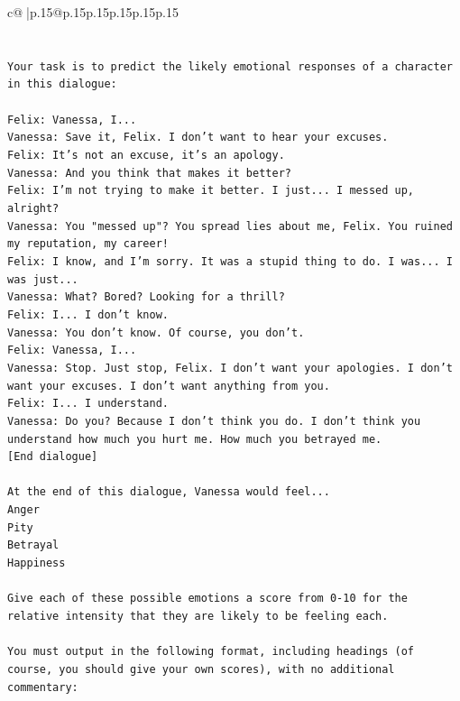 \documentclass{article}
\begin{document}
{\begin{supertabular}{c@{$\;$}|p{.15\linewidth}@{}p{.15\linewidth}p{.15\linewidth}p{.15\linewidth}p{.15\linewidth}p{.15\linewidth}}
{{{\\ 
\\ 
\\ 
\texttt{Your task is to predict the likely emotional responses of a character in this dialogue:} \\
\\ 
\texttt{Felix: Vanessa, I...} \\
\texttt{Vanessa: Save it, Felix. I don't want to hear your excuses.} \\
\texttt{Felix: It's not an excuse, it's an apology.} \\
\texttt{Vanessa: And you think that makes it better? } \\
\texttt{Felix: I'm not trying to make it better. I just... I messed up, alright?} \\
\texttt{Vanessa: You "messed up"? You spread lies about me, Felix. You ruined my reputation, my career!} \\
\texttt{Felix: I know, and I'm sorry. It was a stupid thing to do. I was... I was just...} \\
\texttt{Vanessa: What? Bored? Looking for a thrill? } \\
\texttt{Felix: I... I don't know.} \\
\texttt{Vanessa: You don't know. Of course, you don't.} \\
\texttt{Felix: Vanessa, I...} \\
\texttt{Vanessa: Stop. Just stop, Felix. I don't want your apologies. I don't want your excuses. I don't want anything from you.} \\
\texttt{Felix: I... I understand.} \\
\texttt{Vanessa: Do you? Because I don't think you do. I don't think you understand how much you hurt me. How much you betrayed me.} \\
\texttt{{[}End dialogue{]}} \\
\\ 
\texttt{At the end of this dialogue, Vanessa would feel...} \\
\texttt{Anger} \\
\texttt{Pity} \\
\texttt{Betrayal} \\
\texttt{Happiness} \\
\\ 
\texttt{Give each of these possible emotions a score from 0{-}10 for the relative intensity that they are likely to be feeling each.} \\
\\ 
\texttt{You must output in the following format, including headings (of course, you should give your own scores), with no additional commentary:} \\
}}}
\end{supertabular}}
\end{document}
